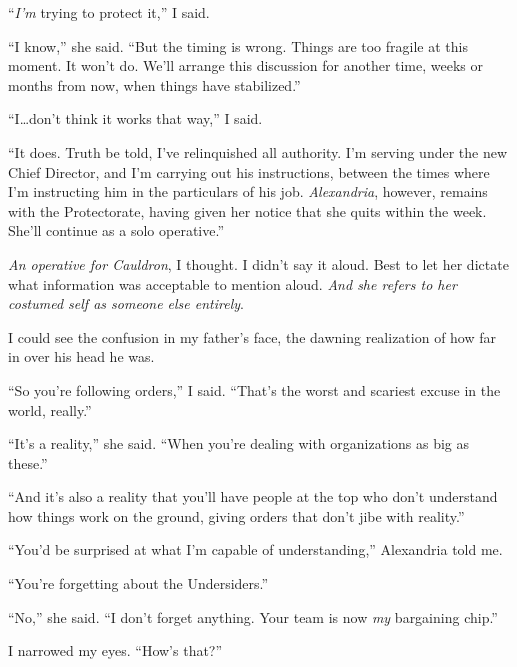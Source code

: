 ``\emph{I'm }trying to protect it,'' I said.



``I know,'' she said.  ``But the timing is wrong.  Things are too fragile at this moment.  It won't do.  We'll arrange this discussion for another time, weeks or months from now, when things have stabilized.''



``I\ldots don't think it works that way,'' I said.



``It does.  Truth be told, I've relinquished all authority.  I'm serving under the new Chief Director, and I'm carrying out his instructions, between the times where I'm instructing him in the particulars of his job.  \emph{Alexandria}, however, remains with the Protectorate, having given her notice that she quits within the week.  She'll continue as a solo operative.''



\emph{An operative for Cauldron}, I thought.  I didn't say it aloud.  Best to let her dictate what information was acceptable to mention aloud.  \emph{And she refers to her costumed self as someone else entirely}.



I could see the confusion in my father's face, the dawning realization of how far in over his head he was.



``So you're following orders,'' I said.  ``That's the worst and scariest excuse in the world, really.''



``It's a reality,'' she said.  ``When you're dealing with organizations as big as these.''



``And it's also a reality that you'll have people at the top who don't understand how things work on the ground, giving orders that don't jibe with reality.''



``You'd be surprised at what I'm capable of understanding,'' Alexandria told me.



``You're forgetting about the Undersiders.''



``No,'' she said.  ``I don't forget anything.  Your team is now \emph{my} bargaining chip.''



I narrowed my eyes.  ``How's that?''



